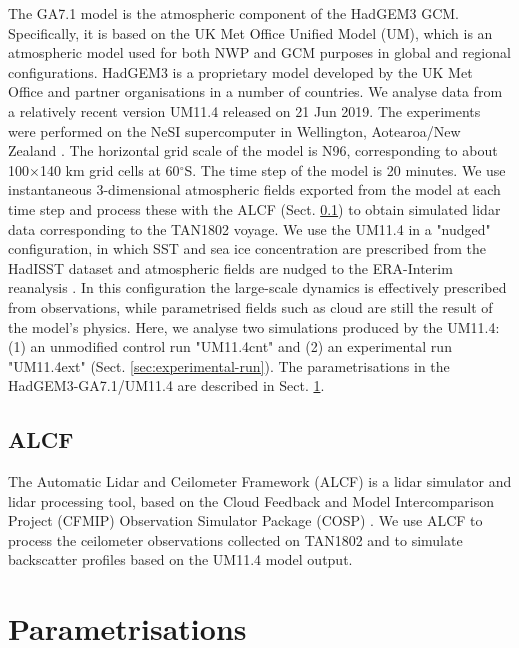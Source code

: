 The GA7.1 model is the atmospheric component of the HadGEM3 GCM.
Specifically, it is based on the UK Met Office Unified Model (UM), which is an
atmospheric model used for both NWP and GCM purposes in global and regional
configurations. HadGEM3 is a proprietary model developed by the UK Met Office
and partner organisations in a number of countries. We analyse data from a relatively
recent version UM11.4 released on 21 Jun 2019. The experiments were performed on the NeSI
supercomputer in Wellington, Aotearoa/New Zealand \citep{williams2016}.
The horizontal grid scale of the model is N96,
corresponding to about 100$\times$140 km grid cells at
60$^\circ$S. The time step of the model is 20 minutes. We use
instantaneous 3-dimensional atmospheric fields exported from the model at each time
step and process these with the ALCF (Sect. \ref{sec:alcf}) to obtain simulated
lidar data corresponding to the TAN1802 voyage. We use the UM11.4 in a "nudged"
configuration, in which SST and sea ice concentration are prescribed from
the HadISST dataset \citep{rayner2003} and atmospheric fields are nudged to the
ERA-Interim reanalysis \citep{dee2011}. In this configuration the large-scale
dynamics is effectively prescribed from observations, while parametrised fields
such as cloud are still the result of the model's physics. Here, we analyse
two simulations produced by the UM11.4: (1) an unmodified control run "UM11.4cnt"
and (2) an experimental run "UM11.4ext" (Sect. \ref{sec:experimental-run}).
The parametrisations in the HadGEM3-GA7.1/UM11.4 are described in Sect. \ref{sec:parametrisations}.

\subsection{ALCF}
\label{sec:alcf}

The Automatic Lidar and Ceilometer Framework (ALCF) \citep{kuma2020} is a lidar
simulator and lidar processing tool, based on the Cloud
Feedback and Model Intercomparison Project (CFMIP) Observation Simulator Package
(COSP) \citep{bodas-salcedo2011}. We use ALCF to process the ceilometer
observations collected on TAN1802 and to simulate backscatter profiles based
on the UM11.4 model output.

\section{Parametrisations}
\label{sec:parametrisations}

